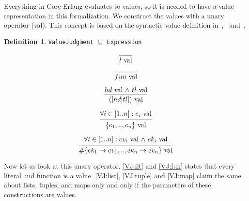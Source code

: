 \documentclass[12pt]{article}
\theoremstyle{definition}
\newtheorem{definition}{Definition}[section]
\numberwithin{equation}{section}
\begin{document}
Everything in Core Erlang evaluates to values, so it is needed to have a value representation in this formalization. We construct the values with a unary operator (val). This concept is based on the syntactic value definition in~\cite{fredlund2001framework},~\cite{fredlund2003verification} and~\cite{vidal2014towards}.

\begin{definition}
\verb|ValueJudgment| $\subseteq$ \verb|Expression|

\begin{center}
	
	\begin{equation}
		\begin{prooftree}
			\infer0{l$ val$}
		\end{prooftree}
		\label{VJ:lit}
	\end{equation}
	
	\begin{equation}
		\begin{prooftree}
			\infer0{fun$ val$}
		\end{prooftree}
		\label{VJ:fun}
	\end{equation}

	\begin{equation}
		\begin{prooftree}
			\hypo{hd$ val $\land$ $tl$ val$}
			\infer1{([hd|tl])$ val$}
		\end{prooftree}
		\label{VJ:list}
	\end{equation}
	
	\begin{equation}
		\begin{prooftree}
			\hypo{\forall i \in [1..n]: e_i$ val$}
			\infer1{$\{$e_1, .., e_n$\} val$}
		\end{prooftree}
		\label{VJ:tuple}
	\end{equation}


	\begin{equation}
		\begin{prooftree}
			\hypo{\forall i \in [1..n]: ev_i$ val $\land$ $ek_i$ val$}
			\infer1{$\#\{$ek_1 \rightarrow ev_1, .., ek_n \rightarrow ev_n$\} val$}
		\end{prooftree}
		\label{VJ:map}
	\end{equation}


\end{center}
\end{definition}

Now let us look at this unary operator. \ref{VJ:lit} and \ref{VJ:fun} states that every literal and function is a value. \ref{VJ:list}, \ref{VJ:tuple} and \ref{VJ:map} claim the same about lists, tuples, and maps only and only if the parameters of these constructions are values.
\end{document}

